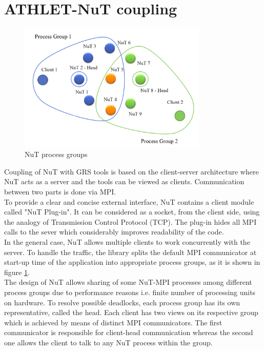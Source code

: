 \section{ATHLET-NuT coupling}
\label{sec:athlet-nut-coupling}

\figpointer{\ref{fig:introduction-nut-process-groups}}
\begin{figure}[htpb]
  \centering
  \includegraphics[width=0.8\textwidth]{figures/introduction-nut-process-groups.png}
\caption{NuT process groups}
\label{fig:introduction-nut-process-groups}
\end{figure}

Coupling of NuT with GRS tools is based on the client-server architecture where NuT acts as a server and the tools can be viewed as clients. Communication between two parts is done via MPI.\\


To provide a clear and concise external interface, NuT contains a client module called "NuT Plug-in". It can be  considered as a socket, from the client side, using the analogy of Transmission Control Protocol (TCP). The plug-in hides all MPI calls to the sever which considerably improves readability of the code.\\


In the general case, NuT allows multiple clients to work concurrently with the server. To handle the traffic, the library splits the default MPI communicator at start-up time of the application into appropriate process groups, as it is shown in figure \ref{fig:introduction-nut-process-groups}.\\



The design of NuT allows sharing of some NuT-MPI processes among different process groups due to performance reasons i.e. finite number of processing units on hardware. To resolve possible deadlocks, each process group has its own representative, called the head. Each client has two views on its respective group which is achieved by means of distinct MPI communicators. The first communicator is responsible for client-head communication whereas the second one allows the client to talk to any NuT process within the group.\\



